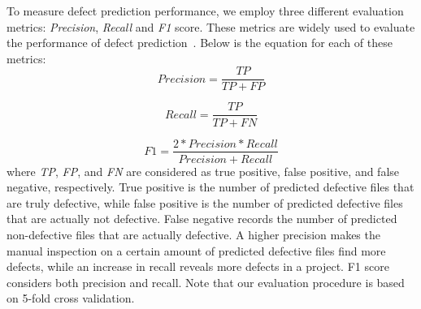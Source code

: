 To measure defect prediction performance, we employ three different evaluation metrics: \textit{Precision}, \textit{Recall} and \textit{F1} score. These metrics are widely used to evaluate the performance of defect prediction~\cite{menzies2007data, menzies2010defect}. %
Below is the equation for each of these metrics:
\begin{equation}
\label{eq:precision}
Precision = \frac{TP}{TP+FP}
\end{equation}

\begin{equation}
\label{eq:recall}
Recall = \frac{TP}{TP+FN}
\end{equation}

\begin{equation}
\label{eq:f1}
F1 = \frac{2 * Precision * Recall}{Precision + Recall}
\end{equation}
where \textit{TP}, \textit{FP}, and \textit{FN} are considered as true positive, false positive, and false negative, respectively. True positive is the number of predicted defective files that are truly defective, while false positive is the number of predicted defective files that are actually not defective. False negative records the number of predicted non-defective files that are actually defective. A higher precision makes the manual inspection on a certain amount of predicted defective files find more defects, while an increase in recall reveals more defects in a project. F1 score considers both precision and recall. Note that our evaluation procedure is based on 5-fold cross validation. 